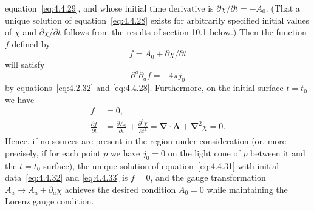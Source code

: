equation~\eqref{eq:4.4.29}, and whose initial time derivative is
\(\partial\chi/\partial t=-A_0\). (That a unique solution of
equation~\eqref{eq:4.4.28} exists for arbitrarily specified initial values of
\(\chi\) and \(\partial\chi/\partial t\) follows from the results of section 10.1
below.) Then the function \(f\) defined by
\begin{equation}
  f=A_0+\partial\chi/\partial t
  \tag{4.4.30}\label{eq:4.4.30}
\end{equation}
will satisfy
\begin{equation}
  \partial^a\partial_af=-4\pi j_0
  \tag{4.4.31}\label{eq:4.4.31}
\end{equation}
by equations~\eqref{eq:4.2.32} and \eqref{eq:4.4.28}. Furthermore, on the initial
surface \(t=t_0\) we have
\begin{align}
  f&=0 ,
    \tag{4.4.32}\label{eq:4.4.32}\\
  \frac{\partial f}{\partial t}
    &=\frac{\partial A_0}{\partial t}
      +\frac{\partial^2\chi}{\partial t^2}
      =\boldsymbol{\nabla}\mathbin{\cdot}\mathbf{A}+\boldsymbol{\nabla}^2\chi=0 .
    \tag{4.4.33}\label{eq:4.4.33}
\end{align}
Hence, if no sources are present in the region under consideration (or, more
precisely, if for each point \(p\) we have \(j_0=0\) on the light cone of \(p\)
between it and the \(t=t_0\) surface), the unique solution of
equation~\eqref{eq:4.4.31} with initial data~\eqref{eq:4.4.32} and
\eqref{eq:4.4.33} is \(f=0\), and the gauge transformation
\(A_a\longrightarrow A_a+\partial_a\chi\) achieves the desired condition
\(A_0=0\) while maintaining the Lorenz gauge condition.

